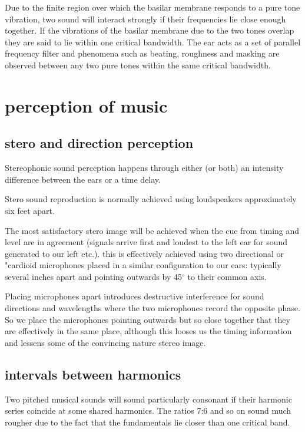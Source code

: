 \documentclass[10pt, a4paper, twocolumn]{article}
\begin{document}
Due to the finite region over which the basilar membrane responds to a pure tone vibration, two sound will interact strongly if their frequencies lie close enough together. If the vibrations of the basilar membrane due to the two tones overlap they are said to lie within one critical bandwidth.  The ear acts as a set of parallel frequency filter and phenomena such as beating, roughness and masking are observed between any two pure tones within the same critical bandwidth.


\section{perception of music}
\subsection{stero and direction perception}

Stereophonic sound perception happens through either (or both) an intensity difference between the ears or a time delay.

Stero sound reproduction is normally achieved using loudspeakers approximately six feet apart.

The most satisfactory stero image will be achieved when the cue from timing and level are in agreement (signals arrive first and loudest to the left ear for sound generated to our left etc.). this is effectively achieved using two directional or "cardioid microphones placed in a similar configuration to our ears: typically several inches apart and pointing outwards by 45$^\circ$ to their common axis.

Placing microphones apart introduces destructive interference for sound directions and wavelengths where the two microphones record the opposite phase. So we place the microphones pointing outwards but so close together that they are effectively in the same place, although this looses us the timing information and lessens some of the convincing nature stereo image.

\subsection{intervals between harmonics}

Two pitched musical sounds will sound particularly consonant if their harmonic series coincide at some shared harmonics. The ratios 7:6 and so on sound much rougher due to the fact that the fundamentals lie closer than one critical band.
\end{document}
